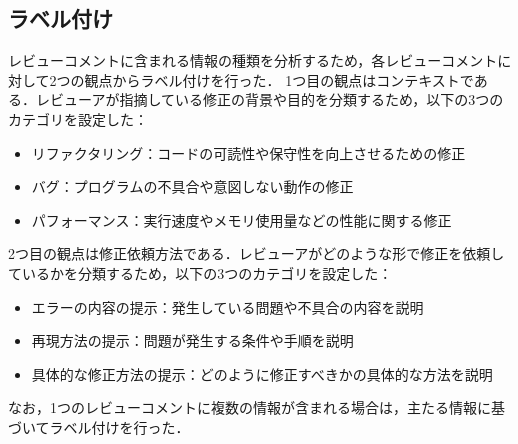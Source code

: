 \documentclass[11pt]{jreport}
\begin{document}
\subsection{ラベル付け}
レビューコメントに含まれる情報の種類を分析するため，各レビューコメントに対して2つの観点からラベル付けを行った．
1つ目の観点はコンテキストである．レビューアが指摘している修正の背景や目的を分類するため，以下の3つのカテゴリを設定した：
\begin{itemize}
\item リファクタリング：コードの可読性や保守性を向上させるための修正
\item バグ：プログラムの不具合や意図しない動作の修正
\item パフォーマンス：実行速度やメモリ使用量などの性能に関する修正
\end{itemize}
2つ目の観点は修正依頼方法である．レビューアがどのような形で修正を依頼しているかを分類するため，以下の3つのカテゴリを設定した：
\begin{itemize}
\item エラーの内容の提示：発生している問題や不具合の内容を説明
\item 再現方法の提示：問題が発生する条件や手順を説明
\item 具体的な修正方法の提示：どのように修正すべきかの具体的な方法を説明
\end{itemize}
なお，1つのレビューコメントに複数の情報が含まれる場合は，主たる情報に基づいてラベル付けを行った．
\end{document}
